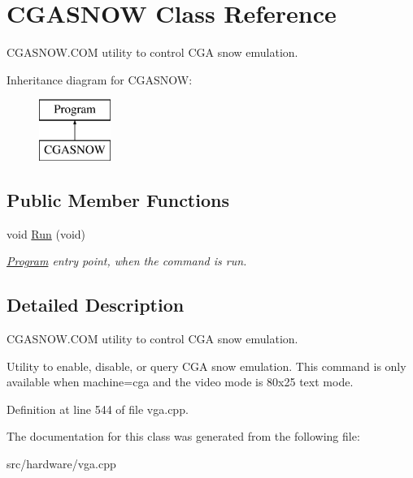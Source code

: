 \hypertarget{classCGASNOW}{\section{C\-G\-A\-S\-N\-O\-W Class Reference}
\label{classCGASNOW}
}


C\-G\-A\-S\-N\-O\-W.\-C\-O\-M utility to control C\-G\-A snow emulation.  


Inheritance diagram for C\-G\-A\-S\-N\-O\-W\-:\begin{figure}[H]
\begin{center}
\leavevmode
\includegraphics[height=2.000000cm]{classCGASNOW}
\end{center}
\end{figure}
\subsection*{Public Member Functions}
\begin{DoxyCompactItemize}
\item 
\hypertarget{classCGASNOW_a756619df2231c00d48df4bfec4a8965b}{void \hyperlink{classCGASNOW_a756619df2231c00d48df4bfec4a8965b}{Run} (void)}\label{classCGASNOW_a756619df2231c00d48df4bfec4a8965b}

\begin{DoxyCompactList}\small\item\em \hyperlink{classProgram}{Program} entry point, when the command is run. \end{DoxyCompactList}\end{DoxyCompactItemize}


\subsection{Detailed Description}
C\-G\-A\-S\-N\-O\-W.\-C\-O\-M utility to control C\-G\-A snow emulation. 

Utility to enable, disable, or query C\-G\-A snow emulation. This command is only available when machine=cga and the video mode is 80x25 text mode. 

Definition at line 544 of file vga.\-cpp.



The documentation for this class was generated from the following file\-:\begin{DoxyCompactItemize}
\item 
src/hardware/vga.\-cpp\end{DoxyCompactItemize}
